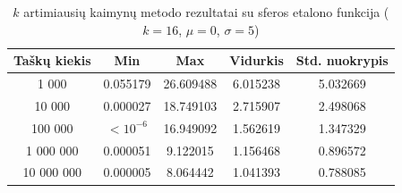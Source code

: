 \begin{table}[H]
    \centering
    \begin{tabular}{|c|c|c|c|c|}
        \hline
        \textbf{Taškų kiekis} & \textbf{Min} & \textbf{Max} & \textbf{Vidurkis} & \textbf{Std. nuokrypis} \\ \hline
        1 000        & 0.055179 & 26.609488 & 6.015238 & 5.032669 \\ \hline
        10 000       & 0.000027 & 18.749103 & 2.715907 & 2.498068 \\ \hline
        100 000      & $<10^{-6}$ & 16.949092 & 1.562619 & 1.347329 \\ \hline
        1 000 000    & 0.000051 & 9.122015 & 1.156468 & 0.896572 \\ \hline
        10 000 000   & 0.000005 & 8.064442 & 1.041393 & 0.788085 \\ \hline
    \end{tabular}
    \caption{$k$ artimiausių kaimynų metodo rezultatai su sferos etalono funkcija ($k = 16$, $\mu = 0$, $\sigma = 5$)}
\end{table}